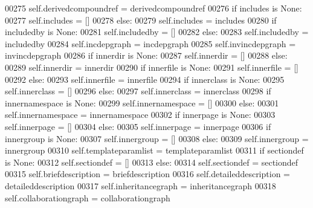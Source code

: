 \begin{DoxyCode}
{{{{{{{{{{{{{{{{{{{{{{{{00275             self.derivedcompoundref = derivedcompoundref
00276         \textcolor{keywordflow}{if} includes \textcolor{keywordflow}{is} \textcolor{keywordtype}{None}:
00277             self.includes = []
00278         \textcolor{keywordflow}{else}:
00279             self.includes = includes
00280         \textcolor{keywordflow}{if} includedby \textcolor{keywordflow}{is} \textcolor{keywordtype}{None}:
00281             self.includedby = []
00282         \textcolor{keywordflow}{else}:
00283             self.includedby = includedby
00284         self.incdepgraph = incdepgraph
00285         self.invincdepgraph = invincdepgraph
00286         \textcolor{keywordflow}{if} innerdir \textcolor{keywordflow}{is} \textcolor{keywordtype}{None}:
00287             self.innerdir = []
00288         \textcolor{keywordflow}{else}:
00289             self.innerdir = innerdir
00290         \textcolor{keywordflow}{if} innerfile \textcolor{keywordflow}{is} \textcolor{keywordtype}{None}:
00291             self.innerfile = []
00292         \textcolor{keywordflow}{else}:
00293             self.innerfile = innerfile
00294         \textcolor{keywordflow}{if} innerclass \textcolor{keywordflow}{is} \textcolor{keywordtype}{None}:
00295             self.innerclass = []
00296         \textcolor{keywordflow}{else}:
00297             self.innerclass = innerclass
00298         \textcolor{keywordflow}{if} innernamespace \textcolor{keywordflow}{is} \textcolor{keywordtype}{None}:
00299             self.innernamespace = []
00300         \textcolor{keywordflow}{else}:
00301             self.innernamespace = innernamespace
00302         \textcolor{keywordflow}{if} innerpage \textcolor{keywordflow}{is} \textcolor{keywordtype}{None}:
00303             self.innerpage = []
00304         \textcolor{keywordflow}{else}:
00305             self.innerpage = innerpage
00306         \textcolor{keywordflow}{if} innergroup \textcolor{keywordflow}{is} \textcolor{keywordtype}{None}:
00307             self.innergroup = []
00308         \textcolor{keywordflow}{else}:
00309             self.innergroup = innergroup
00310         self.templateparamlist = templateparamlist
00311         \textcolor{keywordflow}{if} sectiondef \textcolor{keywordflow}{is} \textcolor{keywordtype}{None}:
00312             self.sectiondef = []
00313         \textcolor{keywordflow}{else}:
00314             self.sectiondef = sectiondef
00315         self.briefdescription = briefdescription
00316         self.detaileddescription = detaileddescription
00317         self.inheritancegraph = inheritancegraph
00318         self.collaborationgraph = collaborationgraph
}}}}}}}}}}}}}}}}}}}}}}}}
\end{DoxyCode}
